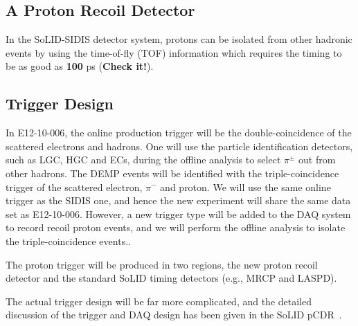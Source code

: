 \subsection{A Proton Recoil Detector}

In the SoLID-SIDIS detector system, protons can be isolated from other hadronic
events by using the time-of-fly (TOF) information which requires the timing to
be as good as {\bf 100} ps ({\bf Check it!}).

\subsection{Trigger Design}
In E12-10-006, the online production trigger will be the double-coincidence of
the scattered electrons and hadrons. One will use the particle identification
detectors, such as LGC, HGC and ECs, during the offline analysis to select
$\pi^{\pm}$ out from other hadrons. The DEMP events will be identified with the
triple-coincidence trigger of the scattered electron, $\pi^{-}$ and proton. We
will use the same online trigger as the SIDIS one, and hence the new experiment
will share the same data set as E12-10-006. However, a new trigger type will be
added to the DAQ system to record recoil proton events, and we will perform the
offline analysis to isolate the triple-coincidence events..

The proton trigger will be produced in two regions, the new proton
recoil detector and the standard SoLID timing detectors (e.g., MRCP and LASPD).

The actual trigger design will be far more complicated, and the detailed
discussion of the trigger and DAQ design has been given in the SoLID
pCDR~\cite{solid_pcdr}.

